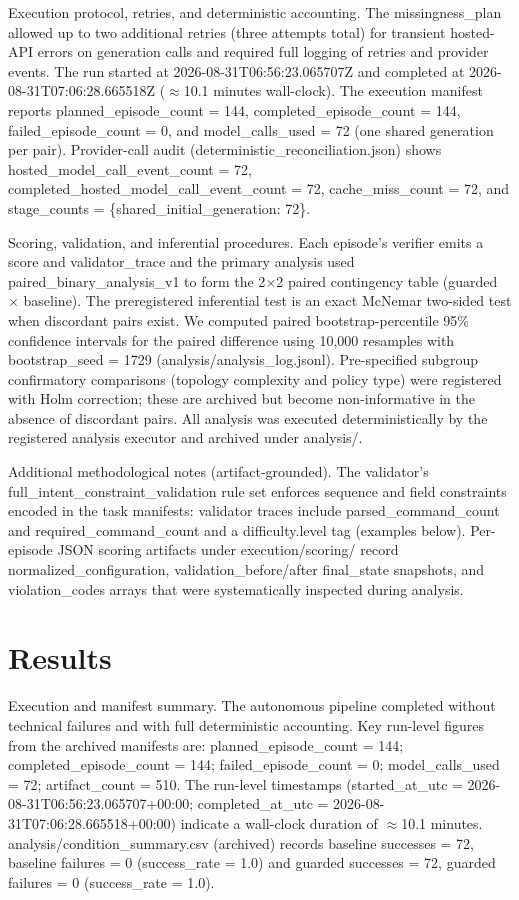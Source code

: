 \documentclass[conference]{IEEEtran}
\begin{document}
Execution protocol, retries, and deterministic accounting. The missingness\_plan allowed up to two additional retries (three attempts total) for transient hosted-API errors on generation calls and required full logging of retries and provider events. The run started at 2026-08-31T06:56:23.065707Z and completed at 2026-08-31T07:06:28.665518Z (\ensuremath{\approx}10.1 minutes wall-clock). The execution manifest reports planned\_episode\_count = 144, completed\_episode\_count = 144, failed\_episode\_count = 0, and model\_calls\_used = 72 (one shared generation per pair). Provider-call audit (deterministic\_reconciliation.json) shows hosted\_model\_call\_event\_count = 72, completed\_hosted\_model\_call\_event\_count = 72, cache\_miss\_count = 72, and stage\_counts = \{shared\_initial\_generation: 72\}.

Scoring, validation, and inferential procedures. Each episode's verifier emits a score and validator\_trace and the primary analysis used paired\_binary\_analysis\_v1 to form the 2\ensuremath{\times}2 paired contingency table (guarded \ensuremath{\times} baseline). The preregistered inferential test is an exact McNemar two-sided test when discordant pairs exist. We computed paired bootstrap-percentile 95\% confidence intervals for the paired difference using 10,000 resamples with bootstrap\_seed = 1729 (analysis/analysis\_log.jsonl). Pre-specified subgroup confirmatory comparisons (topology complexity and policy type) were registered with Holm correction; these are archived but become non-informative in the absence of discordant pairs. All analysis was executed deterministically by the registered analysis executor and archived under analysis/.

Additional methodological notes (artifact-grounded). The validator's full\_intent\_constraint\_validation rule set enforces sequence and field constraints encoded in the task manifests: validator traces include parsed\_command\_count and required\_command\_count and a difficulty.level tag (examples below). Per-episode JSON scoring artifacts under execution/scoring/ record normalized\_configuration, validation\_before/after final\_state snapshots, and violation\_codes arrays that were systematically inspected during analysis.

\section{Results}
Execution and manifest summary. The autonomous pipeline completed without technical failures and with full deterministic accounting. Key run-level figures from the archived manifests are: planned\_episode\_count = 144; completed\_episode\_count = 144; failed\_episode\_count = 0; model\_calls\_used = 72; artifact\_count = 510. The run-level timestamps (started\_at\_utc = 2026-08-31T06:56:23.065707+00:00; completed\_at\_utc = 2026-08-31T07:06:28.665518+00:00) indicate a wall-clock duration of \ensuremath{\approx}10.1 minutes. analysis/condition\_summary.csv (archived) records baseline successes = 72, baseline failures = 0 (success\_rate = 1.0) and guarded successes = 72, guarded failures = 0 (success\_rate = 1.0).
\end{document}
